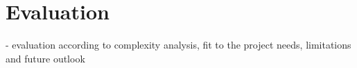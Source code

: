 \section{Evaluation}
- evaluation according to complexity analysis, fit to the project needs, limitations and future outlook


